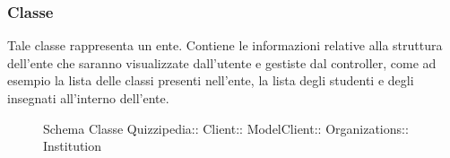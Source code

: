 \subsubsection{Classe }
Tale classe rappresenta un ente. Contiene le informazioni relative alla struttura dell'ente che saranno visualizzate dall'utente e gestiste dal controller, come ad esempio la lista delle classi presenti nell'ente, la lista degli studenti e degli insegnati all'interno dell'ente.
\begin{figure}[H]
\centering
\noindent{}
\caption[Schema Classe Institution]{Schema Classe Quizzipedia:: Client:: ModelClient:: Organizations:: Institution}
\end{figure}
